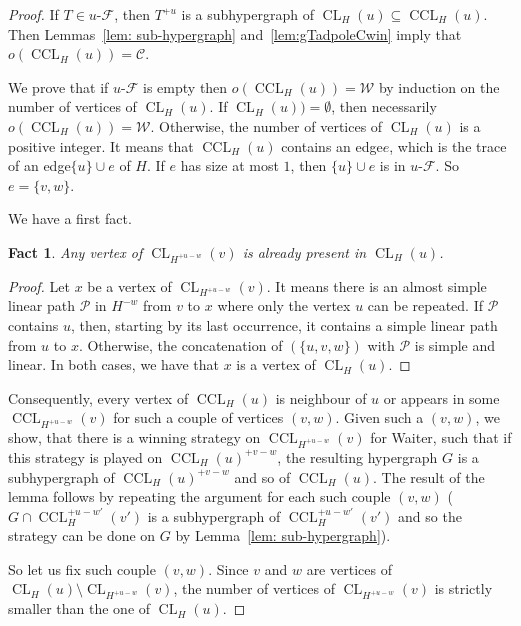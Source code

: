 \documentclass{article}
\newcommand{\hedge}{edge\xspace}
\DeclareMathOperator{\CL}{CL}
\DeclareMathOperator{\CCL}{CCL}
\newcommand{\Client}{\mathcal{C}}
\newcommand{\Waiter}{\mathcal{W}}
\newcommand{\uCwin}{u\text{-}\mathcal{F}}
\newtheorem{fact}[theorem]{Fact}
\begin{document}
\begin{proof}
	If \(T \in \uCwin\), then \(T^{+u}\) is a subhypergraph of \(\CL_H(u) \subseteq \CCL_H(u)\). Then Lemmas~\ref{lem: sub-hypergraph} and~\ref{lem:gTadpoleCwin} imply that \(o(\CCL_H(u)) = \Client\).
	
	We prove that if \(\uCwin\) is empty then \(o(\CCL_H(u)) = \Waiter\) by induction on the number of vertices of \(\CL_{H}(u)\).  If  \(\CL_H(u)) = \emptyset\), then necessarily \(o(\CCL_H(u)) = \Waiter\).
	Otherwise, the number of vertices of \(\CL_H(u)\) is a positive integer. It means that \(\CCL_H(u)\) contains an \hedge \(e\), which is the trace of an \hedge \(\{u\}\cup e\) of \(H\). If \(e\) has size at most \(1\), then \(\{u\}\cup e\) is in \(\uCwin\). So \(e = \{v,w\}\).
	
	We have a first fact.
	\begin{fact}
		 Any vertex of \(\CL_{H^{+u-w}}(v)\) is already present in \(\CL_{H}(u)\). 
	\end{fact}
	\begin{proof}
		Let \(x\) be a vertex of \(\CL_{H^{+u-w}}(v)\). 
		It means there is an almost simple linear path \(\mathcal{P}\) in \(H^{-w}\) from \(v\) to \(x\) where only the vertex \(u\) can be repeated. 
		If \(\mathcal{P}\) contains \(u\), then, starting by its last occurrence, it contains a simple linear path from \(u\) to \(x\). Otherwise, the concatenation of \((\{u,v,w\})\) with \(\mathcal{P}\) is simple and linear. In both cases, we have that \(x\) is a vertex of \(\CL_{H}(u)\).
	\end{proof}
	
	Consequently, every vertex of \(\CCL_H(u)\) is neighbour of \(u\) or appears in some \(\CCL_{H^{+u-w}}(v)\) for such a couple of vertices \((v,w)\).
	Given such a \((v,w)\), we show, that there is a winning strategy on \(\CCL_{H^{+u-w}}(v)\) for Waiter, such that if this strategy is played on \(\CCL_H(u)^{+v-w}\), the resulting hypergraph \(G\) is a subhypergraph of \(\CCL_H(u)^{+v-w}\) and so of \(\CCL_H(u)\). The result of the lemma follows by repeating the argument for each such couple \((v,w)\) (\(G \cap \CCL_H^{+u-w'}(v')\) is a subhypergraph of \(\CCL_H^{+u-w'}(v')\) and so the strategy can be done on \(G\) by Lemma~\ref{lem: sub-hypergraph}). 
	
	So let us fix such couple \((v,w)\).
	Since \(v\) and \(w\) are vertices of \(\CL_H(u)\setminus \CL_{H^{+u-w}}(v)\), the number of vertices of \(\CL_{H^{+u-w}}(v)\) is strictly smaller than the one of \(\CL_H(u)\).


\end{proof}
\end{document}
